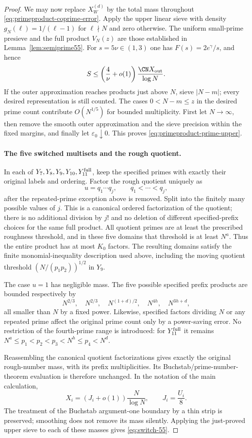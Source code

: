 \begin{proof}
We may now replace $X_W^{(d)}$ by the total mass throughout
\eqref{eq:primeproduct-coprime-error}.
Apply the upper linear sieve with density
$g_N(\ell)=1/(\ell-1)$ for $\ell\nmid N$ and zero otherwise.
The uniform small-prime presieve and the full product $V_N(z)$
are those established in Lemma~\ref{lem:semiprime55}.
For $s=5\nu\in(1,3)$ one has $F(s)=2e^\gamma/s$, and hence
\[
 S\le\left(\frac4\nu+o(1)\right)
                    \frac{\CN X_{\rm out}}{\log N}.
\]
If the outer approximation reaches products just above $N$,
sieve $|N-m|$; every desired representation is still counted.
The cases $0<N-m\le z$ in the desired prime count contribute
$O(N^{1/5})$ for bounded
multiplicity. First let $N\to\infty$, then remove the smooth
outer approximation and the sieve precision within the fixed
margins, and finally let $\varepsilon_0\downarrow0$.
This proves \eqref{eq:primeproduct-prime-upper}.

\paragraph{The five switched multisets and the rough quotient.}
In each of $Y_7,Y_8,Y_9,Y_{10},Y_{11}^{\rm full}$, keep the
specified primes with exactly their original labels and ordering.
Factor the rough quotient uniquely as
\[
 u=q_1\cdots q_j,\qquad q_1<\cdots<q_j,
\]
after the repeated-prime exception above is removed.
Split into the finitely many possible values of $j$.
This is a canonical ordered factorization of the quotient;
there is no additional division by $j!$ and no deletion of
different specified-prefix choices for the same full product.
All quotient primes are at least the prescribed roughness
threshold, and in these five domains that threshold is at least
$N^a$. Thus the entire product has at most $K_0$ factors.
The resulting domains satisfy the finite monomial-inequality
description used above, including the moving quotient threshold
$(N/(p_1p_2))^{1/2}$ in $Y_9$.

The case $u=1$ has negligible mass. The five possible specified
prefix products are bounded respectively by
\[
 N^{2/3},\quad N^{2/3},\quad N^{(1+d)/2},
                  \quad N^{4h},\quad N^{3h+d},
\]
all smaller than $N$ by a fixed power.
Likewise, specified factors dividing $N$ or any repeated
prime affect the original prime count only by a power-saving
error. No restriction of the fourth-prime range is introduced:
for $Y_{11}^{\rm full}$ it remains
$N^a\le p_1<p_2<p_3<N^h\le p_4<N^d$.

Reassembling the canonical quotient factorizations gives exactly
the original rough-number mass, with its prefix multiplicities.
Its Buchstab/prime-number-theorem evaluation is therefore
unchanged. In the notation of the main calculation,
\[
 X_i=(J_i+o(1))\frac{N}{\log N},
 \qquad J_i=\frac{U_i}{8}.
\]
The treatment of the Buchstab argument-one boundary by a thin
strip is preserved; smoothing does not remove its mass silently.
Applying the just-proved upper sieve to each of these masses
gives \eqref{eq:switch-55}.
\end{proof}

